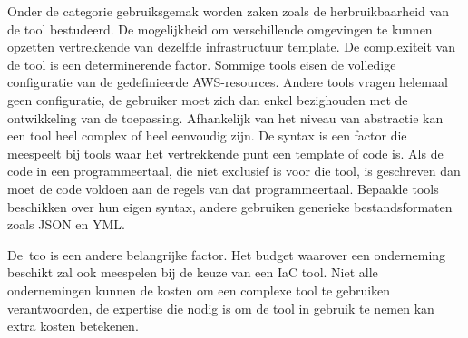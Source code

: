 Onder de categorie gebruiksgemak worden zaken zoals de herbruikbaarheid van de tool bestudeerd.
De mogelijkheid om verschillende omgevingen te kunnen opzetten vertrekkende van dezelfde infrastructuur template.
De complexiteit van de tool is een determinerende factor.
Sommige tools eisen de volledige configuratie van de gedefinieerde AWS-resources.
Andere tools vragen helemaal geen configuratie, de gebruiker moet zich dan enkel bezighouden met de ontwikkeling van de toepassing.
Afhankelijk van het niveau van abstractie kan een tool heel complex of heel eenvoudig zijn.
De syntax is een factor die meespeelt bij tools waar het vertrekkende punt een template of code is.
Als de code in een programmeertaal, die niet exclusief is voor die tool, is geschreven dan moet de code voldoen aan de regels van dat programmeertaal.
Bepaalde tools beschikken over hun eigen syntax, andere gebruiken generieke bestandsformaten zoals JSON en YML.

De~\acrfull{tco} is een andere belangrijke factor.
Het budget waarover een onderneming beschikt zal ook meespelen bij de keuze van een IaC tool.
Niet alle ondernemingen kunnen de kosten om een complexe tool te gebruiken verantwoorden, de expertise die nodig is om de tool in gebruik te nemen kan extra kosten betekenen.

%

